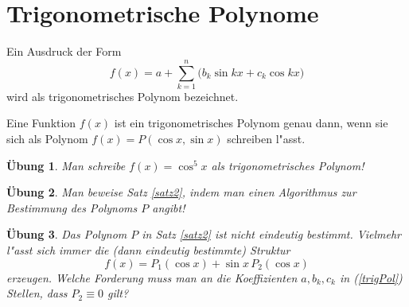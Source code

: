 \documentclass[11pt]{article}
\newtheorem{uebung}{\"{U}bung}
\begin{document}
\section{Trigonometrische Polynome}
Ein Ausdruck der Form
\begin{equation}\label{trigPol}
  f(x)=a+\sum_{k=1}^n \big(b_k\sin kx+c_k\cos kx\big)
\end{equation}
wird als trigonometrisches Polynom bezeichnet. 
\begin{satz}
  \label{satz2}
  Eine Funktion $f(x)$ ist ein trigonometrisches Polynom genau dann, wenn 
  sie sich als Polynom $f(x)=P(\cos x,\sin x)$ schreiben l"asst.
\end{satz}
\begin{uebung}
  Man schreibe $f(x)=\cos^5x$ als trigonometrisches Polynom!
\end{uebung}
\begin{uebung}
  Man beweise Satz \ref{satz2}, indem man einen Algorithmus zur Bestimmung des
  Polynoms $P$ angibt!
\end{uebung}
\begin{uebung}
  Das Polynom $P$ in Satz \ref{satz2} ist nicht eindeutig bestimmt. Vielmehr
  l"asst sich immer die (dann eindeutig bestimmte) Struktur
  \begin{equation}
    f(x)=P_1(\cos x)+\sin x\,P_2(\cos x)
  \end{equation}
  erzeugen. Welche Forderung muss man an die Koeffizienten $a,b_k,c_k$ in
  (\ref{trigPol}) Stellen, dass $P_2\equiv0$ gilt?
\end{uebung}
%
\end{document}
